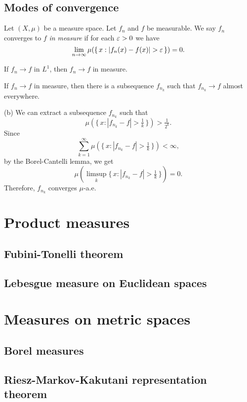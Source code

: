\documentclass{../note}
\begin{document}
\section{Modes of convergence}

\begin{prb}
\end{prb}

\begin{prb}
Let $(X,\mu)$ be a measure space.
Let $f_n$ and $f$ be measurable.
We say $f_n$ converges to $f$ \emph{in measure} if for each $\varepsilon>0$ we have
\[\lim_{n\to\infty}\mu(\{\,x:|f_n(x)-f(x)|>\e\,\})=0.\]
\begin{parts}
\item If $f_n\to f$ in $L^1$, then $f_n\to f$ in measure.
\item If $f_n\to f$ in measure, then there is a subsequence $f_{n_k}$ such that $f_{n_k}\to f$ almost everywhere.
\end{parts}
\end{prb}
\begin{pf}
(b)
We can extract a subsequence $f_{n_k}$ such that
\[\mu(\{\,x:|f_{n_k}-f|>\tfrac1k\,\})>\tfrac1{2^k}.\]
Since
\[\sum_{k=1}^\infty\mu(\{\,x:|f_{n_k}-f|>\tfrac1k\,\})<\infty,\]
by the Borel-Cantelli lemma, we get
\[\mu(\limsup_k\{\,x:|f_{n_k}-f|>\tfrac1k\,\})=0.\]
Therefore, $f_{n_k}$ converges $\mu$-a.e.
\end{pf}


\chapter{Product measures}
\section{Fubini-Tonelli theorem}
\section{Lebesgue measure on Euclidean spaces}


\chapter{Measures on metric spaces}
\section{Borel measures}

\section{Riesz-Markov-Kakutani representation theorem}
\end{document}
